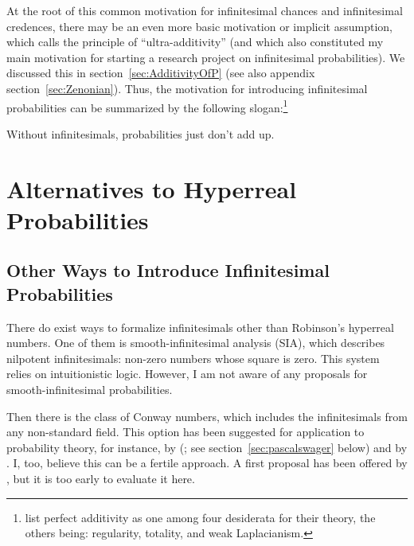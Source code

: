 At the root of this common motivation for infinitesimal chances and infinitesimal credences, there may be an even more basic motivation or implicit assumption, which \citet{Skyrms:1983a} calls the principle of ``ultra-additivity'' (and which also constituted my main motivation for starting a research project on infinitesimal probabilities). We discussed this in section~\ref{sec:AdditivityOfP} (see also appendix section~\ref{sec:Zenonian}).
Thus, the motivation for introducing infinitesimal probabilities can be summarized by the following slogan:\footnote{\citet{Benci_etal:2018} list perfect additivity as one among four desiderata for their theory, the others being: regularity, totality, and weak Laplacianism.}
\begin{center}
Without infinitesimals, probabilities just don't add up.
\end{center}

\section{Alternatives to Hyperreal Probabilities}\label{sec:OtherApproaches}
\subsection{Other Ways to Introduce Infinitesimal Probabilities}
There do exist ways to formalize infinitesimals other than Robinson's hyperreal numbers. One of them is smooth-infinitesimal analysis (SIA), which describes nilpotent infinitesimals: non-zero numbers whose square is zero. This system relies on intuitionistic logic. However, I am not aware of any proposals for smooth-infinitesimal probabilities.

Then there is the class of Conway numbers, which includes the infinitesimals from any non-standard field. This option has been suggested for application to probability theory, for instance, by \citeauthor{Hajek:2003b} (\citeyear{Hajek:2003b}; see section~\ref{sec:pascalswager} below) and
by \citet{Easwaran:2014}. I, too, believe this can be a fertile approach. A first proposal has been offered by \citet{ChenRubio:forthc}, but it is too early to evaluate it here.

